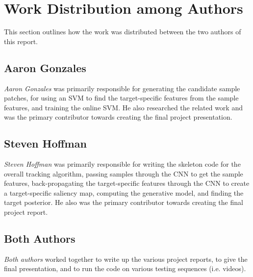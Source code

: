 \documentclass{sig-alternate-05-2015}
\begin{document}
\section{Work Distribution among Authors}
This section outlines how the work was distributed between the two authors of this report. 

\subsection{Aaron Gonzales}
\textit{Aaron Gonzales} was primarily responsible for generating the candidate sample patches, for using an SVM to find the target-specific features from the sample features, and training the online SVM.
He also researched the related work and was the primary contributor towards creating the final project presentation.

\subsection{Steven Hoffman}
\textit{Steven Hoffman} was primarily responsible for writing the skeleton code for the overall tracking algorithm, passing samples through the CNN to get the sample features, back-propagating the target-specific features through the CNN to create a target-specific saliency map, computing the generative model, and finding the target posterior.
He also was the primary contributor towards creating the final project report.

\subsection{Both Authors}
\textit{Both authors} worked together to write up the various project reports, to give the final presentation, and to run the code on various testing sequences (i.e. videos).



\end{document}
